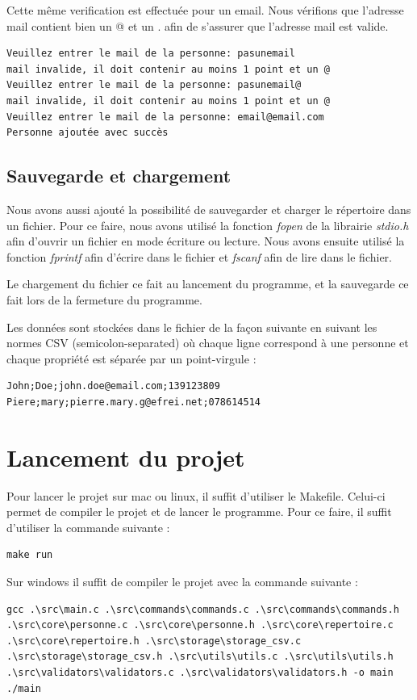 \documentclass[12pt]{report}
\begin{document}
Cette même verification est effectuée pour un email. Nous vérifions que l'adresse mail contient bien un @ et un . afin de s'assurer que l'adresse mail est valide.

\begin{verbatim}
Veuillez entrer le mail de la personne: pasunemail
mail invalide, il doit contenir au moins 1 point et un @
Veuillez entrer le mail de la personne: pasunemail@
mail invalide, il doit contenir au moins 1 point et un @
Veuillez entrer le mail de la personne: email@email.com
Personne ajoutée avec succès
\end{verbatim}

\section{Sauvegarde et chargement}
Nous avons aussi ajouté la possibilité de sauvegarder et charger le répertoire dans un fichier. Pour ce faire, nous avons utilisé la fonction \textit{fopen} de la librairie \textit{stdio.h} afin d'ouvrir un fichier en mode écriture ou lecture. Nous avons ensuite utilisé la fonction \textit{fprintf} afin d'écrire dans le fichier et \textit{fscanf} afin de lire dans le fichier.

Le chargement du fichier ce fait au lancement du programme, et la sauvegarde ce fait lors de la fermeture du programme.

Les données sont stockées dans le fichier de la façon suivante en suivant les normes CSV (semicolon-separated) où chaque ligne correspond à une personne et chaque propriété est séparée par un point-virgule :
\begin{verbatim}
John;Doe;john.doe@email.com;139123809
Piere;mary;pierre.mary.g@efrei.net;078614514
\end{verbatim}

\chapter{Lancement du projet}
Pour lancer le projet sur mac ou linux, il suffit d'utiliser le Makefile. Celui-ci permet de compiler le projet et de lancer le programme. Pour ce faire, il suffit d'utiliser la commande suivante :
\begin{verbatim}
make run
\end{verbatim}

Sur windows il suffit de compiler le projet avec la commande suivante :

\begin{verbatim}
gcc .\src\main.c .\src\commands\commands.c .\src\commands\commands.h .\src\core\personne.c .\src\core\personne.h .\src\core\repertoire.c .\src\core\repertoire.h .\src\storage\storage_csv.c .\src\storage\storage_csv.h .\src\utils\utils.c .\src\utils\utils.h .\src\validators\validators.c .\src\validators\validators.h -o main
./main
\end{verbatim}
\end{document}
